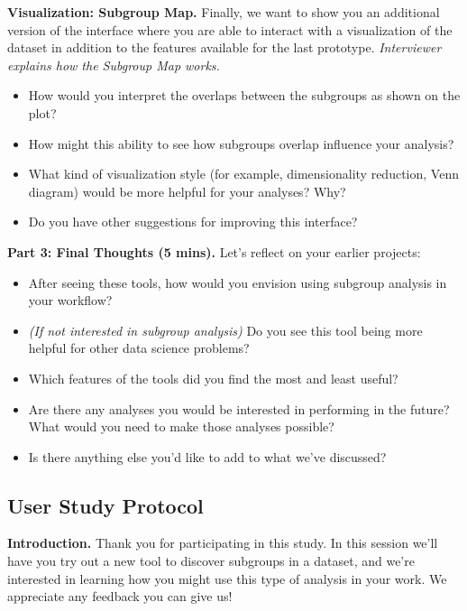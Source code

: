 \textbf{Visualization: Subgroup Map.}
Finally, we want to show you an additional version of the interface where you are able to interact with a visualization of the dataset in addition to the features available for the last prototype. \textit{Interviewer explains how the Subgroup Map works.}
\begin{itemize}
    \item How would you interpret the overlaps between the subgroups as shown on the plot?
    \item How might this ability to see how subgroups overlap influence your analysis?
    \item What kind of visualization style (for example, dimensionality reduction, Venn diagram) would be more helpful for your analyses? Why?
    \item Do you have other suggestions for improving this interface?
\end{itemize}

\noindent \textbf{Part 3: Final Thoughts (5 mins).}
Let’s reflect on your earlier projects:  
\begin{itemize}
    \item After seeing these tools, how would you envision using subgroup analysis in your workflow?
    \item \textit{(If not interested in subgroup analysis)} Do you see this tool being more helpful for other data science problems?
    \item Which features of the tools did you find the most and least useful?
    \item Are there any analyses you would be interested in performing in the future? What would you need to make those analyses possible?
    \item Is there anything else you’d like to add to what we’ve discussed?
\end{itemize}


\subsection{User Study Protocol}
\label{app:user-study}

\noindent \textbf{Introduction.} Thank you for participating in this study. In this session we’ll have you try out a new tool to discover subgroups in a dataset, and we’re interested in learning how you might use this type of analysis in your work. We appreciate any feedback you can give us!

